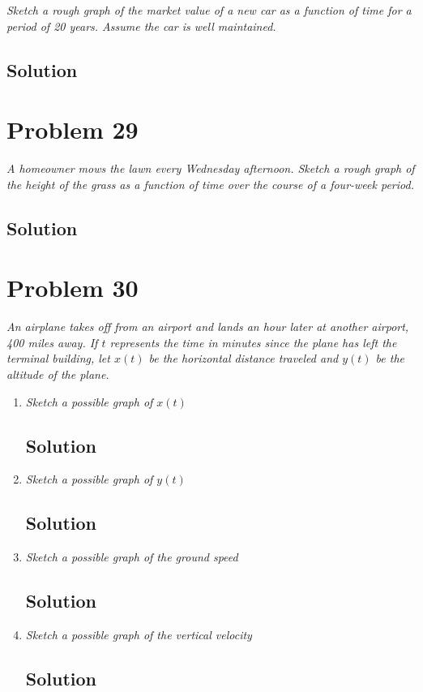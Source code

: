 \documentclass[11pt]{article}
\newcommand{\soln}{\subsection*}
\newcommand{\qn}{\textit}
\begin{document}
\qn{Sketch a rough graph of the market value of a new car as a function of time for a period of 20 years. Assume the car is well maintained.}

\soln{Solution}

\section*{Problem 29}

\qn{A homeowner mows the lawn every Wednesday afternoon. Sketch a rough graph of the height of the grass as a function of time over the course of a four-week period.}

\soln{Solution}

\section*{Problem 30}

\qn{An airplane takes off from an airport and lands an hour later at another airport, 400 miles away. If $t$ represents the time in minutes since the plane has left the terminal building, let $x(t)$ be the horizontal distance traveled and $y(t)$ be the altitude of the plane.}

\begin{enumerate}
	\item \qn{Sketch a possible graph of $x(t)$}
	\soln{Solution}
	
	\item \qn{Sketch a possible graph of $y(t)$}
	\soln{Solution}
	
	\item \qn{Sketch a possible graph of the ground speed}
	\soln{Solution}
	
	\item \qn{Sketch a possible graph of the vertical velocity}
	\soln{Solution}
\end{enumerate}
\end{document}
